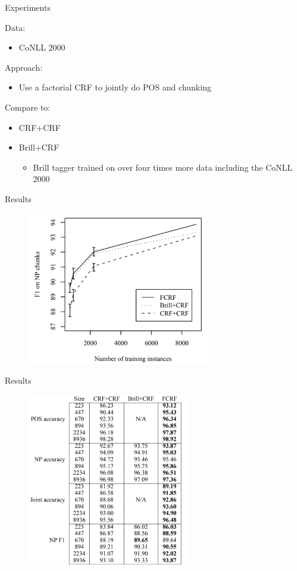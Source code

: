 \documentclass[presentation,bigger]{beamer}
\begin{document}
\begin{frame}[label={sec:orgheadline22}]{Experiments}
\begin{block}{Data:}
\begin{itemize}
\item CoNLL 2000
\end{itemize}
\end{block}
\begin{block}{Approach:}
\begin{itemize}
\item Use a factorial CRF to jointly do POS and chunking
\end{itemize}
\end{block}
\begin{block}{Compare to:}
\begin{itemize}
\item CRF+CRF
\item Brill+CRF
\begin{itemize}
\item Brill tagger trained on over four times more data including the CoNLL 2000
\end{itemize}
\end{itemize}
\end{block}
\end{frame}
\begin{frame}[label={sec:orgheadline23}]{Results}
\begin{figure}[htb]
\centering
\includegraphics[width=8cm]{figures/npgraph.pdf}
\end{figure}
\end{frame}
\begin{frame}[label={sec:orgheadline24}]{Results}
\begin{figure}[htb]
\centering
\includegraphics[width=7cm]{figures/nptab.pdf}
\end{figure}
\end{frame}
\end{document}
